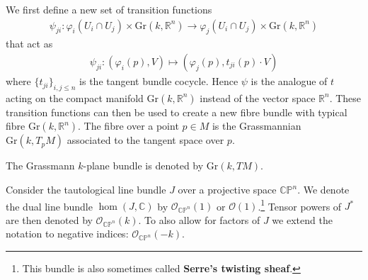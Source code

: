     \begin{construct}\label{manifolds:grassmann_bundle}
        We first define a new set of transition functions
        \begin{gather}
            \psi_{ji}:\varphi_i(U_i\cap U_j)\times \text{Gr}(k, \mathbb{R}^n) \rightarrow \varphi_j(U_i\cap U_j)\times \text{Gr}(k, \mathbb{R}^n)
        \end{gather}
        that act as
        \begin{gather}
            \psi_{ji}:(\varphi_i(p), V)\mapsto(\varphi_j(p), t_{ji}(p)\cdot V)
        \end{gather}
        where $\{t_{ji}\}_{i,j\leq n}$ is the tangent bundle cocycle. Hence $\psi$ is the analogue of $t$ acting on the compact manifold $\text{Gr}(k, \mathbb{R}^n)$ instead of the vector space $\mathbb{R}^n$. These transition functions can then be used to create a new fibre bundle with typical fibre $\text{Gr}(k, \mathbb{R}^n)$. The fibre over a point $p\in M$ is the Grassmannian $\text{Gr}(k, T_pM)$ associated to the tangent space over $p$.
    \end{construct}
    \begin{notation}
        The Grassmann $k$-plane bundle is denoted by $\text{Gr}(k, TM)$.
    \end{notation}


    \begin{definition}
        Consider the tautological line bundle $J$ over a projective space $\mathbb{C}\mathbb{P}^n$. We denote the dual line bundle $\hom(J, \mathbb{C})$ by $\mathcal{O}_{\mathbb{CP}^n}(1)$ or $\mathcal{O}(1)$.\footnote{This bundle is also sometimes called \textbf{Serre's twisting sheaf}.} Tensor powers of $J^*$ are then denoted by $\mathcal{O}_{\mathbb{CP}^n}(k)$. To also allow for factors of $J$ we extend the notation to negative indices: $\mathcal{O}_{\mathbb{CP}^n}(-k)$.
    \end{definition}

